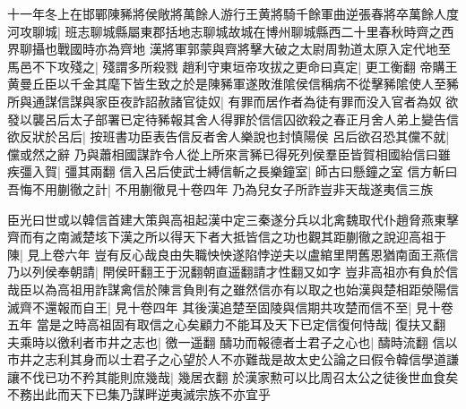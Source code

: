十一年冬上在邯鄲陳豨將侯敞將萬餘人游行王黄將騎千餘軍曲逆張春將卒萬餘人度河攻聊城|{
	班志聊城縣屬東郡括地志聊城故城在博州聊城縣西二十里春秋時齊之西界聊攝也戰國時亦為齊地}
漢將軍郭蒙與齊將擊大破之太尉周勃道太原入定代地至馬邑不下攻殘之|{
	殘謂多所殺戮}
趙利守東垣帝攻拔之更命曰真定|{
	更工衡翻}
帝購王黄曼丘臣以千金其麾下皆生致之於是陳豨軍遂敗淮隂侯信稱病不從擊豨隂使人至豨所與通謀信謀與家臣夜詐詔赦諸官徒奴|{
	有罪而居作者為徒有罪而没入官者為奴}
欲發以襲呂后太子部署已定待豨報其舍人得罪於信信囚欲殺之春正月舍人弟上變告信欲反狀於呂后|{
	按班書功臣表告信反者舍人樂說也封慎陽侯}
呂后欲召恐其儻不就|{
	儻或然之辭}
乃與蕭相國謀詐令人從上所來言豨已得死列侯羣臣皆賀相國紿信曰雖疾彊入賀|{
	彊其兩翻}
信入呂后使武士縛信斬之長樂鐘室|{
	師古曰懸鐘之室}
信方斬曰吾悔不用蒯徹之計|{
	不用蒯徹見十卷四年}
乃為兒女子所詐豈非天哉遂夷信三族

臣光曰世或以韓信首建大策與高祖起漢中定三秦遂分兵以北禽魏取代仆趙脅燕東擊齊而有之南滅楚垓下漢之所以得天下者大抵皆信之功也觀其距蒯徹之說迎高祖于陳|{
	見上卷六年}
豈有反心哉良由失職怏怏遂陷悖逆夫以盧綰里閈舊恩猶南面王燕信乃以列侯奉朝請|{
	閈侯旰翻王于況翻朝直遥翻請才性翻又如字}
豈非高祖亦有負於信哉臣以為高祖用詐謀禽信於陳言負則有之雖然信亦有以取之也始漢與楚相距滎陽信滅齊不還報而自王|{
	見十卷四年}
其後漢追楚至固陵與信期共攻楚而信不至|{
	見十卷五年}
當是之時高祖固有取信之心矣顧力不能耳及天下已定信復何恃哉|{
	復扶又翻}
夫乘時以徼利者市井之志也|{
	徼一遥翻}
醻功而報德者士君子之心也|{
	醻時流翻}
信以市井之志利其身而以士君子之心望於人不亦難哉是故太史公論之曰假令韓信學道謙讓不伐已功不矜其能則庶幾哉|{
	幾居衣翻}
於漢家勲可以比周召太公之徒後世血食矣不務出此而天下已集乃謀畔逆夷滅宗族不亦宜乎

